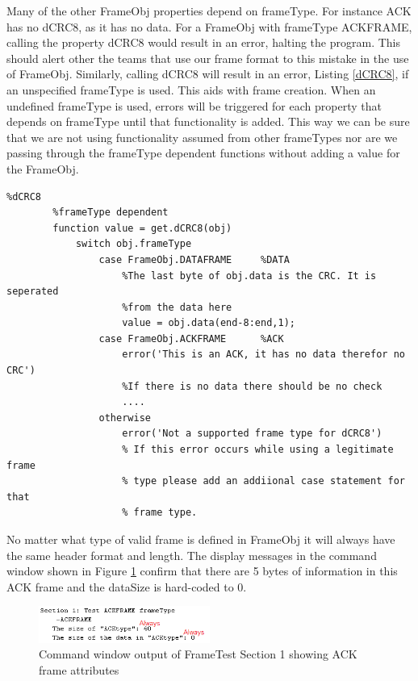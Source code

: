 Many of the other FrameObj properties depend on frameType. For instance ACK has no dCRC8, as it has no data. For a FrameObj with frameType ACKFRAME, calling the property dCRC8 would result in an error, halting the program. This should alert other the teams that use our frame format to this mistake in the use of FrameObj. Similarly, calling dCRC8 will result in an error, Listing \ref{dCRC8}, if an unspecified frameType is used. This aids with frame creation. When an undefined frameType is used, errors will be triggered for each property that depends on frameType until that functionality is added. This way we can be sure that we are not using functionality assumed from other frameTypes nor are we passing through the frameType dependent functions without adding a value for the FrameObj. 

\begin{lstlisting} 
%dCRC8
        %frameType dependent
        function value = get.dCRC8(obj)
            switch obj.frameType
                case FrameObj.DATAFRAME     %DATA
                    %The last byte of obj.data is the CRC. It is seperated
                    %from the data here
                    value = obj.data(end-8:end,1);
                case FrameObj.ACKFRAME      %ACK
                    error('This is an ACK, it has no data therefor no CRC')
                    %If there is no data there should be no check
					....
				otherwise
                    error('Not a supported frame type for dCRC8')
                    % If this error occurs while using a legitimate frame
                    % type please add an addiional case statement for that
                    % frame type.
\end{lstlisting}

No matter what type of valid frame is defined in FrameObj it will always have the same header format and length. The display messages in the command window shown in Figure \ref{fig:FrameTest1} confirm that there are 5 bytes of information in this ACK frame and the dataSize is hard-coded to 0. 

\begin{figure}[ht]
    \includegraphics[width=0.5\textwidth]{FrameTest1.PNG}
    \caption{Command window output of FrameTest Section 1 showing ACK frame attributes }
    \label{fig:FrameTest1}
\end{figure}

